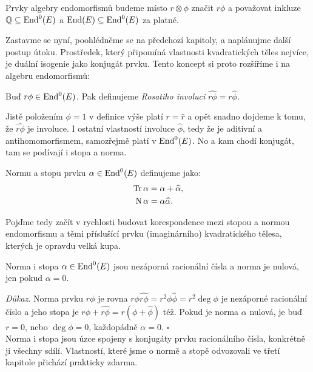 \documentclass [12pt]{report}
\begin{document}
\begin{umluva}
Prvky algebry endomorfismů budeme místo $r \otimes \phi$ značit $r \phi$ a považovat inkluze $\mathbb{Q} \subseteq \operatorname{End}^0 (E)$ a $\operatorname{End}(E) \subseteq \operatorname{End}^0 (E)$ za platné.
\end{umluva}

Zastavme se nyní, poohlédněme se na předchozí kapitoly, a naplánujme další postup útoku. Prostředek, který připomíná vlastnosti kvadratických těles nejvíce, je duální isogenie jako konjugát prvku. Tento koncept si proto rozšíříme i na algebru endomorfismů:
\begin{definice}
Buď $r \phi \in \operatorname{End}^0 (E)$. Pak definujeme \textit{Rosatiho involuci} $\widehat{r \phi} = r \widehat{\phi}$.
\end{definice}
Jistě položením $\phi = 1$ v definice výše platí $r = \widehat{r}$ a opět snadno dojdeme k tomu, že $\widehat{r \phi}$ je involuce. I ostatní vlastností involuce $\widehat{\phi}$, tedy že je aditivní a antihomomorfismem, samozřejmě platí v $\operatorname{End}^0 (E)$. No a kam chodí konjugát, tam se podívají i stopa a norma.
\begin{definice}
Normu a stopu prvku $\alpha \in \operatorname{End}^0(E)$ definujeme jako:
\begin{align*}
\operatorname{Tr} \alpha &= \alpha+\widehat{\alpha},\\
\operatorname{N} \alpha &= \alpha \widehat{\alpha}. 
\end{align*}
\end{definice}

Pojďme tedy začít v rychlosti budovat korespondence mezi stopou a normou endomorfismu a těmi příslušící prvku (imaginárního) kvadratického tělesa, kterých je opravdu velká kupa.

\begin{veta}
Norma i stopa $\alpha \in \operatorname{End}^0 (E)$ jsou nezáporná racionální čísla a norma je nulová, jen pokud $\alpha = 0$.
\end{veta}
\noindent \textit{Důkaz}. Norma prvku $r \phi$ je rovna $r \phi \widehat{r \phi} = r^2 \phi \widehat{\phi} = r^2 \deg \phi$ je nezáporné racionální číslo a jeho stopa je $r \phi + \widehat{r \phi} = r (\phi+\widehat{\phi})$ též. Pokud je norma $\alpha$ nulová, je buď $r=0$, nebo $\deg \phi = 0$, každopádně $\alpha = 0$. \hfill $\square$\\

Norma i stopa jsou úzce spojeny s konjugáty prvku racionálního čísla, konkrétně ji všechny sdílí. Vlastností, které jsme o normě a stopě odvozovali ve třetí kapitole přichází prakticky zdarma.
\end{document}
